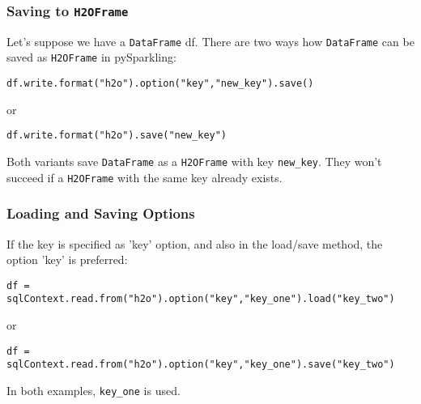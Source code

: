 \subsubsection{Saving to \texttt{H2OFrame}}

Let's suppose we have a \texttt{DataFrame} df. There are two ways how \texttt{DataFrame} can be saved as 
\texttt{H2OFrame} in pySparkling:

\begin{lstlisting}[style=Scala]
df.write.format("h2o").option("key","new_key").save()
\end{lstlisting}
or
\begin{lstlisting}[style=Scala]
df.write.format("h2o").save("new_key")
\end{lstlisting}

Both variants save \texttt{DataFrame} as a \texttt{H2OFrame} with key \texttt{new\_key}. They won't succeed if a \texttt{H2OFrame} with the same key already exists.

\subsubsection{Loading and Saving Options}

If the key is specified as 'key' option, and also in the load/save method, the option 'key' is preferred:
\begin{lstlisting}[style=Scala]
df = sqlContext.read.from("h2o").option("key","key_one").load("key_two")
\end{lstlisting}
or
\begin{lstlisting}[style=Scala]
df = sqlContext.read.from("h2o").option("key","key_one").save("key_two")
\end{lstlisting}

In both examples, \texttt{key\_one} is used.

